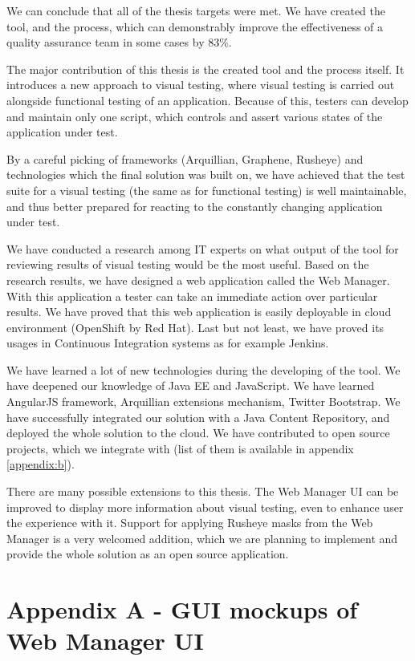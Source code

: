 \documentclass[11pt,oneside,final]{fithesis2}
\begin{document}
We can conclude that all of the thesis targets were met. We have created the tool, and the process, which can demonstrably improve the effectiveness
of a quality assurance team in some cases by 83\%.

The major contribution of this thesis is the created tool and the process itself. It introduces a new approach to visual testing, where
visual testing is carried out alongside functional testing of an application. Because of this, testers can develop and maintain only one
script, which controls and assert various states of the application under test.

By a careful picking of frameworks (Arquillian, Graphene, Rusheye) and technologies which the final solution was built on, we have 
achieved that the test suite for a visual testing (the same as for functional testing) is well maintainable, and thus better prepared for reacting 
to the constantly changing application under test.

We have conducted a research among IT experts on what output of the tool for reviewing results of visual testing would be the most useful. Based
on the research results, we have designed a web application called the Web Manager. With this application a tester can take an immediate action
over particular results. We have proved that this web application is easily deployable in cloud environment (OpenShift by Red Hat). Last but
not least, we have proved its usages in Continuous Integration systems as for example Jenkins.

We have learned a lot of new technologies during the developing of the tool. We have deepened our knowledge of Java EE and JavaScript. 
We have learned AngularJS framework, Arquillian extensions mechanism, Twitter Bootstrap. We have successfully integrated our solution with
a Java Content Repository, and deployed the whole solution to the cloud. We have contributed to open source projects, which we integrate 
with (list of them is available in appendix \ref{appendix:b}).

There are many possible extensions to this thesis. The Web Manager UI can be improved to display more information about visual testing,
even to enhance user the experience with it. Support for applying Rusheye masks from the Web Manager is a very welcomed addition, which we are planning
to implement and provide the whole solution as an open source application.

\appendix
\chapter{Appendix A - GUI mockups of Web Manager UI}
\label{appendeix:a}
\end{document}
